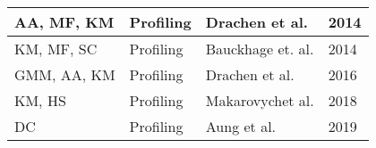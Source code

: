 \begin{table}[h]
\begin{tabularx}{\textwidth}{|l|l|l|X|}
\hline
AA, MF, KM                               & Profiling                          & Drachen et al. \cite{drachen2014comparison}         & 2014                                \\ 
\hline
KM, MF, SC                               & Profiling                          & Bauckhage et. al. \cite{bauckhage2014clustering}    & 2014                                \\ 
\hline
GMM, AA, KM                              & Profiling                          & Drachen et al.~
 \cite{bauckhage2014clustering}     & 2016                                \\ 
\hline
KM, HS                                   & Profiling                          & Makarovychet al. \cite{makarovych2018like}          & 2018                                \\ 
\hline
DC                                       & Profiling                          & Aung et al. \cite{aung2019trails}                   & 2019                                \\
\hline
\end{tabularx}
\end{table}
